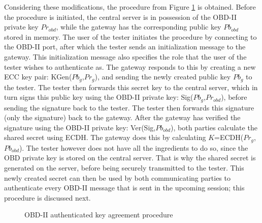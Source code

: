 Considering these modifications, the procedure from Figure \ref{fig:authentication_procedure} is obtained. Before the procedure is initiated, the central server is in possession of the OBD-II private key $Pr_{obd}$, while the gateway has the corresponding public key $Pb_{obd}$ stored in memory. The user of the tester initiates the procedure by connecting to the OBD-II port, after which the tester sends an initialization message to the gateway. This initialization message also specifies the role that the user of the tester wishes to authenticate as. The gateway responds to this by creating a new ECC key pair: KGen($Pb_g$,$Pr_g$), and sending the newly created public key $Pb_g$ to the tester. The tester then forwards this secret key to the central server, which in turn signs this public key using the OBD-II private key: Sig($Pb_g$,$Pr_{obd}$), before sending the signature back to the tester. The tester then forwards this signature (only the signature) back to the gateway. After the gateway has verified the signature using the OBD-II private key: Ver(Sig,$Pb_{obd}$), both parties calculate the shared secret using ECDH. The gateway does this by calculating $K$=ECDH($Pr_g$,$Pb_{obd}$). The tester however does not have all the ingredients to do so, since the OBD private key is stored on the central server. That is why the shared secret is generated on the server, before being securely transmitted to the tester. This newly created secret can then be used by both communicating parties to authenticate every OBD-II message that is sent in the upcoming session; this procedure is discussed next.
 
\begin{figure}[h]
	\centering
	\caption{OBD-II authenticated key agreement procedure}
	\label{fig:authentication_procedure}
\end{figure}

